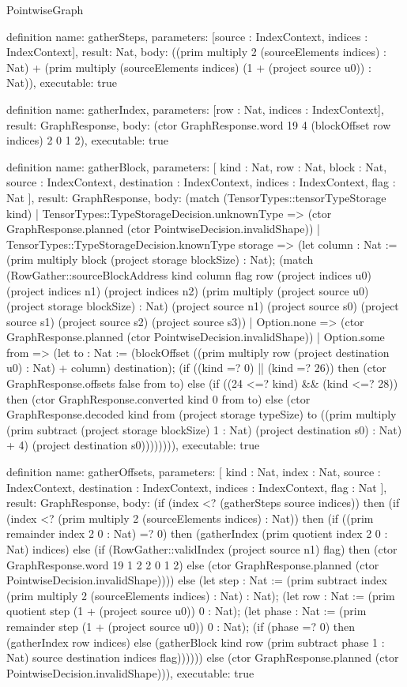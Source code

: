 \begin{lexlean}{PointwiseGraph}
\begin{semanticmodule}
definition{
  name: gatherSteps,
  parameters: [source : IndexContext, indices : IndexContext],
  result: Nat,
  body: ((prim multiply 2 (sourceElements indices) : Nat) + (prim multiply (sourceElements indices) (1 + (project source u0)) : Nat)),
  executable: true
}

definition{
  name: gatherIndex,
  parameters: [row : Nat, indices : IndexContext],
  result: GraphResponse,
  body: (ctor GraphResponse.word 19 4 (blockOffset row indices) 2 0 1 2),
  executable: true
}

definition{
  name: gatherBlock,
  parameters: [
    kind : Nat,
    row : Nat,
    block : Nat,
    source : IndexContext,
    destination : IndexContext,
    indices : IndexContext,
    flag : Nat
  ],
  result: GraphResponse,
  body: (match (TensorTypes::tensorTypeStorage kind)
    | TensorTypes::TypeStorageDecision.unknownType => (ctor GraphResponse.planned (ctor PointwiseDecision.invalidShape))
    | TensorTypes::TypeStorageDecision.knownType storage => (let column : Nat := (prim multiply block (project storage blockSize) : Nat); (match (RowGather::sourceBlockAddress kind column flag row (project indices u0) (project indices n1) (project indices n2) (prim multiply (project source u0) (project storage blockSize) : Nat) (project source n1) (project source s0) (project source s1) (project source s2) (project source s3))
      | Option.none => (ctor GraphResponse.planned (ctor PointwiseDecision.invalidShape))
      | Option.some from => (let to : Nat := (blockOffset ((prim multiply row (project destination u0) : Nat) + column) destination);
        (if ((kind =? 0) || (kind =? 26)) then (ctor GraphResponse.offsets false from to) else
          (if ((24 <=? kind) && (kind <=? 28)) then (ctor GraphResponse.converted kind 0 from to) else
            (ctor GraphResponse.decoded kind from (project storage typeSize) to ((prim multiply (prim subtract (project storage blockSize) 1 : Nat) (project destination s0) : Nat) + 4) (project destination s0)))))))),
  executable: true
}

definition{
  name: gatherOffsets,
  parameters: [
    kind : Nat,
    index : Nat,
    source : IndexContext,
    destination : IndexContext,
    indices : IndexContext,
    flag : Nat
  ],
  result: GraphResponse,
  body: (if (index <? (gatherSteps source indices)) then (if (index <? (prim multiply 2 (sourceElements indices) : Nat)) then (if ((prim remainder index 2 0 : Nat) =? 0) then (gatherIndex (prim quotient index 2 0 : Nat) indices) else (if (RowGather::validIndex (project source n1) flag) then (ctor GraphResponse.word 19 1 2 2 0 1 2) else (ctor GraphResponse.planned (ctor PointwiseDecision.invalidShape)))) else (let step : Nat := (prim subtract index (prim multiply 2 (sourceElements indices) : Nat) : Nat); (let row : Nat := (prim quotient step (1 + (project source u0)) 0 : Nat); (let phase : Nat := (prim remainder step (1 + (project source u0)) 0 : Nat); (if (phase =? 0) then (gatherIndex row indices) else (gatherBlock kind row (prim subtract phase 1 : Nat) source destination indices flag)))))) else (ctor GraphResponse.planned (ctor PointwiseDecision.invalidShape))),
  executable: true
}


\end{semanticmodule}
\end{lexlean}
